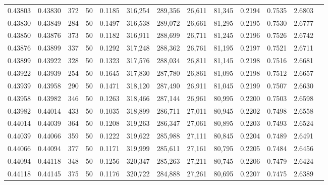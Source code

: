\begin{tabular}{rrrrrrrrrrrrr}
0.43803 & 0.43830 &   372 &  50 &                                     0.1185 & 316,254 & 289,356 &  26,611 &  81,345 & 0.2194 & 0.7535 & 2.6803 \\
0.43830 & 0.43849 &   284 &  50 &                                     0.1497 & 316,538 & 289,072 &  26,661 &  81,295 & 0.2195 & 0.7530 & 2.6777 \\
0.43850 & 0.43876 &   373 &  50 &                                     0.1182 & 316,911 & 288,699 &  26,711 &  81,245 & 0.2196 & 0.7526 & 2.6742 \\
0.43876 & 0.43899 &   337 &  50 &                                     0.1292 & 317,248 & 288,362 &  26,761 &  81,195 & 0.2197 & 0.7521 & 2.6711 \\
0.43899 & 0.43922 &   328 &  50 &                                     0.1323 & 317,576 & 288,034 &  26,811 &  81,145 & 0.2198 & 0.7516 & 2.6681 \\
0.43922 & 0.43939 &   254 &  50 &                                     0.1645 & 317,830 & 287,780 &  26,861 &  81,095 & 0.2198 & 0.7512 & 2.6657 \\
0.43939 & 0.43958 &   290 &  50 &                                     0.1471 & 318,120 & 287,490 &  26,911 &  81,045 & 0.2199 & 0.7507 & 2.6630 \\
0.43958 & 0.43982 &   346 &  50 &                                     0.1263 & 318,466 & 287,144 &  26,961 &  80,995 & 0.2200 & 0.7503 & 2.6598 \\
0.43982 & 0.44014 &   433 &  50 &                                     0.1035 & 318,899 & 286,711 &  27,011 &  80,945 & 0.2202 & 0.7498 & 2.6558 \\
0.44014 & 0.44039 &   364 &  50 &                                     0.1208 & 319,263 & 286,347 &  27,061 &  80,895 & 0.2203 & 0.7493 & 2.6524 \\
0.44039 & 0.44066 &   359 &  50 &                                     0.1222 & 319,622 & 285,988 &  27,111 &  80,845 & 0.2204 & 0.7489 & 2.6491 \\
0.44066 & 0.44094 &   377 &  50 &                                     0.1171 & 319,999 & 285,611 &  27,161 &  80,795 & 0.2205 & 0.7484 & 2.6456 \\
0.44094 & 0.44118 &   348 &  50 &                                     0.1256 & 320,347 & 285,263 &  27,211 &  80,745 & 0.2206 & 0.7479 & 2.6424 \\
0.44118 & 0.44145 &   375 &  50 &                                     0.1176 & 320,722 & 284,888 &  27,261 &  80,695 & 0.2207 & 0.7475 & 2.6389 \\

\end{tabular}
